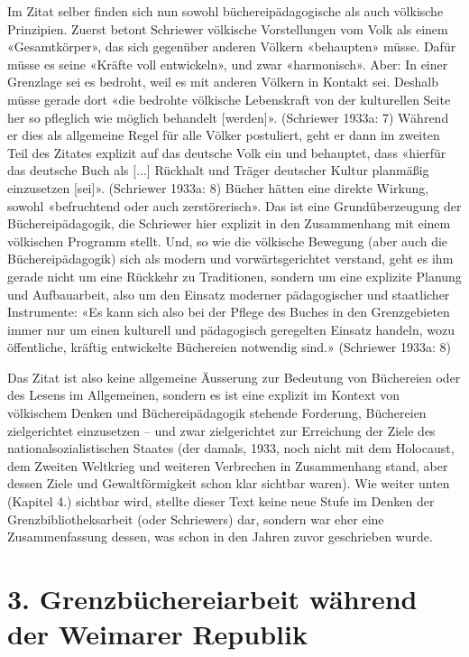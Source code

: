 \documentclass[a4paper,
fontsize=11pt,
oneside,
numbers=noperiodatend,
parskip=half-,
bibliography=totoc,
final
]{scrartcl}
\begin{document}
Im Zitat selber finden sich nun sowohl büchereipädagogische als auch
völkische Prinzipien. Zuerst betont Schriewer völkische Vorstellungen
vom Volk als einem «Gesamtkörper», das sich gegenüber anderen Völkern
«behaupten» müsse. Dafür müsse es seine «Kräfte voll entwickeln», und
zwar «harmonisch». Aber: In einer Grenzlage sei es bedroht, weil es mit
anderen Völkern in Kontakt sei. Deshalb müsse gerade dort «die bedrohte
völkische Lebenskraft von der kulturellen Seite her so pfleglich wie
möglich behandelt {[}werden{]}». (Schriewer 1933a: 7) Während er dies
als allgemeine Regel für alle Völker postuliert, geht er dann im zweiten
Teil des Zitates explizit auf das deutsche Volk ein und behauptet, dass
«hierfür das deutsche Buch als {[}...{]} Rückhalt und Träger deutscher
Kultur planmäßig einzusetzen {[}sei{]}». (Schriewer 1933a: 8) Bücher
hätten eine direkte Wirkung, sowohl «befruchtend oder auch
zerstörerisch». Das ist eine Grundüberzeugung der Büchereipädagogik, die
Schriewer hier explizit in den Zusammenhang mit einem völkischen
Programm stellt. Und, so wie die völkische Bewegung (aber auch die
Büchereipädagogik) sich als modern und vorwärtsgerichtet verstand, geht
es ihm gerade nicht um eine Rückkehr zu Traditionen, sondern um eine
explizite Planung und Aufbauarbeit, also um den Einsatz moderner
pädagogischer und staatlicher Instrumente: «Es kann sich also bei der
Pflege des Buches in den Grenzgebieten immer nur um einen kulturell und
pädagogisch geregelten Einsatz handeln, wozu öffentliche, kräftig
entwickelte Büchereien notwendig sind.» (Schriewer 1933a: 8)

Das Zitat ist also keine allgemeine Äusserung zur Bedeutung von
Büchereien oder des Lesens im Allgemeinen, sondern es ist eine explizit
im Kontext von völkischem Denken und Büchereipädagogik stehende
Forderung, Büchereien zielgerichtet einzusetzen -- und zwar
zielgerichtet zur Erreichung der Ziele des nationalsozialistischen
Staates (der damals, 1933, noch nicht mit dem Holocaust, dem Zweiten
Weltkrieg und weiteren Verbrechen in Zusammenhang stand, aber dessen
Ziele und Gewaltförmigkeit schon klar sichtbar waren). Wie weiter unten
(Kapitel 4.) sichtbar wird, stellte dieser Text keine neue Stufe im
Denken der Grenzbibliotheksarbeit (oder Schriewers) dar, sondern war
eher eine Zusammenfassung dessen, was schon in den Jahren zuvor
geschrieben wurde.

\hypertarget{grenzbuxfcchereiarbeit-wuxe4hrend-der-weimarer-republik}{%
\section{3. Grenzbüchereiarbeit während der Weimarer
Republik}\label{grenzbuxfcchereiarbeit-wuxe4hrend-der-weimarer-republik}}
\end{document}
